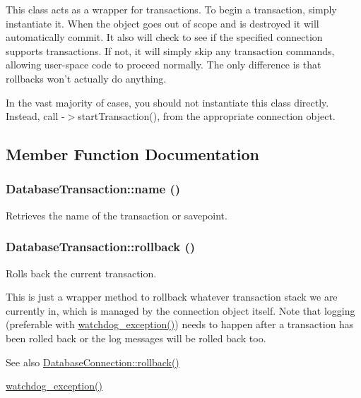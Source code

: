 This class acts as a wrapper for transactions. To begin a transaction, simply instantiate it. When the object goes out of scope and is destroyed it will automatically commit. It also will check to see if the specified connection supports transactions. If not, it will simply skip any transaction commands, allowing user-\/space code to proceed normally. The only difference is that rollbacks won't actually do anything.

In the vast majority of cases, you should not instantiate this class directly. Instead, call -\/$>$startTransaction(), from the appropriate connection object. 

\subsection{Member Function Documentation}
\hypertarget{classDatabaseTransaction_ae1a70609e1ea2bb1e3d7e58f7e19e0ed}{
\subsubsection[{name}]{\setlength{\rightskip}{0pt plus 5cm}DatabaseTransaction::name ()}}
\label{classDatabaseTransaction_ae1a70609e1ea2bb1e3d7e58f7e19e0ed}
Retrieves the name of the transaction or savepoint. \hypertarget{classDatabaseTransaction_a51bdf8ca9423cc331e877dbf43cd6981}{
\subsubsection[{rollback}]{\setlength{\rightskip}{0pt plus 5cm}DatabaseTransaction::rollback ()}}
\label{classDatabaseTransaction_a51bdf8ca9423cc331e877dbf43cd6981}
Rolls back the current transaction.

This is just a wrapper method to rollback whatever transaction stack we are currently in, which is managed by the connection object itself. Note that logging (preferable with \hyperlink{bootstrap_8inc_aba38f35647efce6b4099dc59131e216b}{watchdog\_\-exception()}) needs to happen after a transaction has been rolled back or the log messages will be rolled back too.

\begin{DoxySeeAlso}{See also}
\hyperlink{classDatabaseConnection_aef0f8cd6cbfbc304e721baaa14be14cf}{DatabaseConnection::rollback()} 

\hyperlink{bootstrap_8inc_aba38f35647efce6b4099dc59131e216b}{watchdog\_\-exception()} 
\end{DoxySeeAlso}


